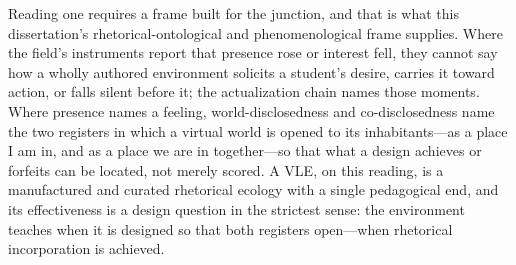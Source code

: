 Reading one requires a frame built for the junction, and that is what this
dissertation's rhetorical-ontological and phenomenological frame supplies. Where
the field's instruments report that presence rose or interest fell, they cannot
say how a wholly authored environment solicits a student's desire, carries it
toward action, or falls silent before it; the actualization chain names those
moments.
Where presence names a feeling, world-disclosedness and co-disclosedness name
the two registers in which a virtual world is opened to its inhabitants---as a
place I am in, and as a place we are in together---so that what a design
achieves or forfeits can be located, not merely scored. A VLE, on this reading,
is a manufactured and curated rhetorical ecology with a single pedagogical end,
and its effectiveness is a design question in the strictest sense: the
environment teaches when it is designed so that both registers open---when
rhetorical incorporation is achieved.


